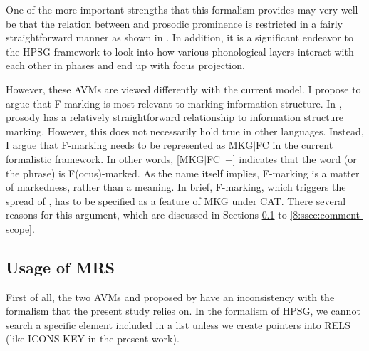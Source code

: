 

\noindent One of the more important strengths that this formalism provides
may very well be that the relation between  and prosodic
prominence is restricted in a fairly straightforward manner as shown
in . In addition, it is a
significant endeavor to the HPSG framework to look into how various
phonological layers interact with each other in phases and end up with
focus projection.


However, these AVMs are viewed differently with the current model.  I
propose to argue that F-marking is most relevant to marking
information structure. In , prosody has a
relatively straightforward relationship to information structure
marking. However, this does not necessarily hold true in other
languages.  Instead, I argue that F-marking needs to be represented as
MKG{$\mid$}FC in the current formalistic framework. In other words,
\mbox{[MKG{$\mid$}FC +]} indicates that the word (or the phrase) is
F(ocus)-marked. As the name itself implies, F-marking is a
matter of markedness, rather than a meaning. In brief, F-marking,
which triggers the spread of , has to be specified as a
feature of MKG under CAT. There several reasons for this argument,
which are discussed in Sections \ref{8:ssec:usage} to
\ref{8:ssec:comment-scope}.



\subsection{Usage of MRS}
\label{8:ssec:usage}


First of all, the two AVMs
 and
 proposed by
\citet{bildhauer:07} have an inconsistency with the 
formalism that the present study relies on.  In the 
formalism of HPSG, we cannot search a specific element
included in a list unless we create pointers into RELS (like ICONS-KEY
in the present work).






